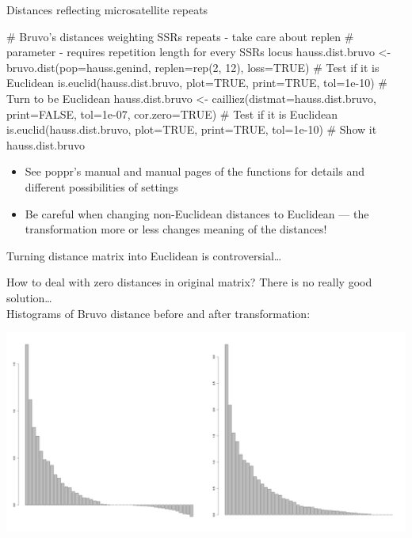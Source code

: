 \documentclass[compress, ucs, xelatex, 11pt, xcolor=svgnames,
  hyperref={
    bookmarks=true,
    unicode=true,
    colorlinks=true,
    pdftitle={Molecular data in R},
    plainpages=false,
    pdfauthor={Vojtech Zeisek},
    pdfsubject={Course about phylogeny and evolution in R},
    pdfcreator={XeLaTeX},
    pdfkeywords={R, evolution, phylogeny, molecular data},
    linkcolor=Tomato,
    anchorcolor=SaddleBrown,
    citecolor=Goldenrod,
    filecolor=DarkMagenta,
    menucolor=Sienna,
    urlcolor=DarkTurquoise,
    pdftex},
  url={hyphens, lowtilde} %
  ]{beamer}
\begin{document}
\begin{frame}[fragile]{Distances reflecting microsatellite repeats}
  \begin{spluscode}
    # Bruvo's distances weighting SSRs repeats - take care about replen
    # parameter - requires repetition length for every SSRs locus
    hauss.dist.bruvo <- bruvo.dist(pop=hauss.genind, replen=rep(2, 12),
      loss=TRUE)
    # Test if it is Euclidean
    is.euclid(hauss.dist.bruvo, plot=TRUE, print=TRUE, tol=1e-10)
    # Turn to be Euclidean
    hauss.dist.bruvo <- cailliez(distmat=hauss.dist.bruvo, print=FALSE,
      tol=1e-07, cor.zero=TRUE)
    # Test if it is Euclidean
    is.euclid(hauss.dist.bruvo, plot=TRUE, print=TRUE, tol=1e-10)
    # Show it
    hauss.dist.bruvo
  \end{spluscode}
  \begin{itemize}
    \item See poppr's manual and manual pages of the functions for details and different possibilities of settings
    \item Be careful when changing non-Euclidean distances to Euclidean --- \alert{the transformation more or less changes meaning of the distances!}
  \end{itemize}
\end{frame}

\begin{frame}{Turning distance matrix into Euclidean is controversial\ldots}
  \begin{footnotesize}
    How to deal with zero distances in original matrix? There is no really good solution\ldots\\ Histograms of Bruvo distance before and after transformation:
  \end{footnotesize}
  \begin{center}
    \includegraphics[width=\textwidth]{bruvodist.png}
  \end{center}
\end{frame}
\end{document}

